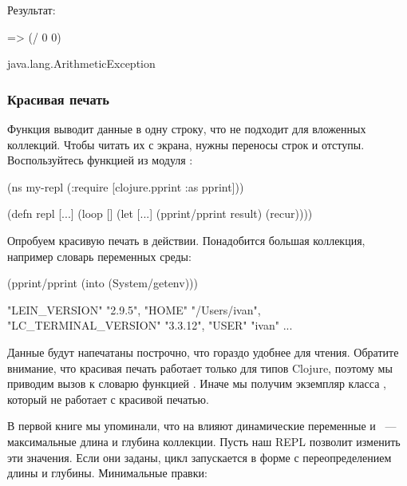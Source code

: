 Результат:

\begin{english}
  \begin{clojure}
=> (/ 0 0)

java.lang.ArithmeticException
  \end{clojure}
\end{english}

\subsubsection{Красивая печать}

Функция  выводит данные в одну строку, что не подходит для вложенных коллекций. Чтобы читать их с экрана, нужны переносы строк и отступы. Воспользуйтесь функцией  из модуля :

\begin{english}
  \begin{clojure}
(ns my-repl
  (:require
   [clojure.pprint :as pprint]))

(defn repl
  [...]
  (loop []
    (let [...]
      (pprint/pprint result)
      (recur))))
  \end{clojure}
\end{english}

Опробуем красивую печать в действии. Понадобится большая коллекция, например словарь переменных среды:

\pagebreaklarge

\begin{english}
  \begin{clojure}
(pprint/pprint
  (into {} (System/getenv)))

{"LEIN_VERSION" "2.9.5",
 "HOME" "/Users/ivan",
 "LC_TERMINAL_VERSION" "3.3.12",
 "USER" "ivan"
 ...
 }
  \end{clojure}
\end{english}

Данные будут напечатаны построчно, что гораздо удобнее для чтения. Обратите внимание, что красивая печать работает только для типов Clojure, поэтому мы приводим вызов  к словарю функцией . Иначе мы получим экземпляр класса , который не работает с красивой печатью.

В первой книге мы упоминали, что на  влияют динамические переменные  и ~--- максимальные длина и глубина коллекции. Пусть наш REPL позволит изменить эти значения. Если они заданы, цикл запускается в форме  с переопределением длины и глубины. Минимальные правки:

